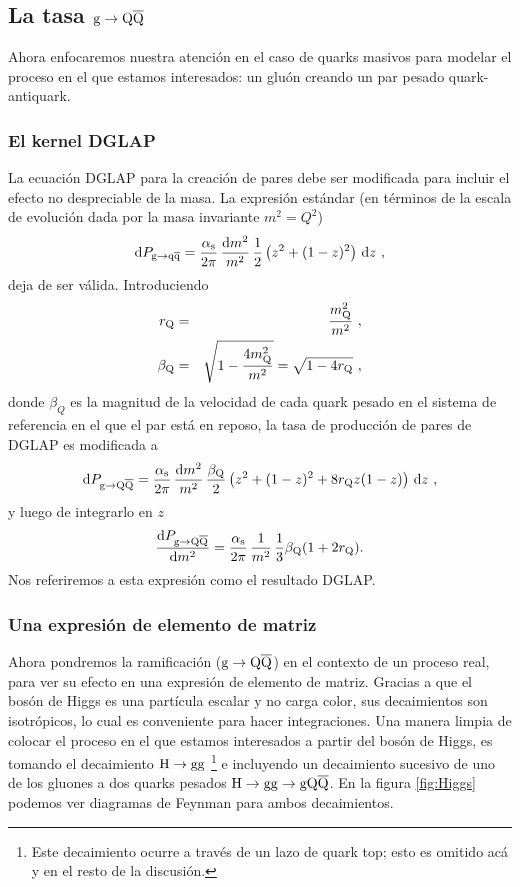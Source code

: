 \documentclass[a4paper,12pt]{article}
\begin{document}
\subsection{La tasa ${\mathrm g}\to{\mathrm Q}\overline{\mathrm Q}$}

Ahora enfocaremos nuestra atención en el caso de quarks masivos para modelar el proceso en el que estamos interesados: un gluón creando un par pesado quark-antiquark.

\subsubsection{El kernel DGLAP}

La ecuación DGLAP para la creación de pares debe ser modificada para incluir el efecto no despreciable de la masa. La expresión estándar (en términos de la escala de evolución dada por la masa invariante $m^2=Q^2$)
\begin{equation}
{\mathrm d} P_{{\mathrm g} \to {\mathrm q}\overline{\mathrm q}} = \frac{\alpha_{\mathrm{s}}}{2\pi} \, \frac{{\mathrm d} m^2}{m^2} \,
\frac{1}{2} \left( z^2 + (1 - z)^2 \right) \, {\mathrm d} z ~ ,
\label{eq:DGLAP:gqq}
\end{equation}
deja de ser válida. Introduciendo
\begin{eqnarray}
 r_{{\mathrm Q}} & = & \frac{ m_{{\mathrm Q}}^2 }{ m^2 } ~, \\
\beta_{{\mathrm Q}} & = & \sqrt{ 1 - \frac{ 4 m_{{\mathrm Q}}^2 }{ m^2 } }
   = \sqrt{ 1 - 4 r_{{\mathrm Q}} } ~,
\end{eqnarray}
donde $\beta_Q$ es la magnitud de la velocidad de cada quark pesado en el sistema de referencia en el que el par está en reposo, la tasa de producción de pares de DGLAP es modificada a
\begin{equation}
{\mathrm d} P_{{\mathrm g} \to {\mathrm Q}\overline{\mathrm Q}} = \frac{\alpha_{\mathrm{s}}}{2\pi} \, \frac{{\mathrm d} m^2}{m^2} \,
\frac{\beta_{{\mathrm Q}}}{2} \left( z^2 + (1 - z)^2 + 8 r_{{\mathrm Q}} z (1 - z) \right) 
\, {\mathrm d} z ~ , 
\end{equation}
y luego de integrarlo en $z$
\begin{equation}
\frac{{\mathrm d} P_{{\mathrm g} \to {\mathrm Q}\overline{\mathrm Q}}}{{\mathrm d} m^2} = \frac{\alpha_{\mathrm{s}}}{2\pi} \, \frac{1}{m^2} \,
\frac{1}{3} \beta_{{\mathrm Q}} (1 + 2 r_{{\mathrm Q}}).
\label{m2DGLAP} 
\end{equation}
Nos referiremos a esta expresión como el resultado DGLAP.

\subsubsection{Una expresión de elemento de matriz}

Ahora pondremos la ramificación (${\mathrm g}\to{\mathrm Q}\overline{\mathrm Q}$) en el contexto de un proceso real, para ver su efecto en una expresión de elemento de matriz. Gracias a que el bosón de Higgs es una partícula escalar y no carga color, sus decaimientos son isotrópicos, lo cual es conveniente para hacer integraciones. Una manera limpia de colocar el proceso en el que estamos interesados a partir del bosón de Higgs, es tomando el decaimiento ${\mathrm H}\to{\mathrm g}{\mathrm g}$ \footnote{Este decaimiento ocurre a través de un lazo de quark top; esto es omitido acá y en el resto de la discusión.} e incluyendo un decaimiento sucesivo de uno de los gluones a dos quarks pesados ${\mathrm H}\to{\mathrm g}{\mathrm g}\to{\mathrm g}{\mathrm Q}\overline{\mathrm Q}$. En la figura \ref{fig:Higgs} podemos ver diagramas de Feynman para ambos decaimientos. 
\end{document}
